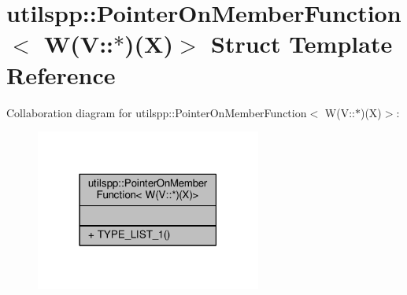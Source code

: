 \hypertarget{structutilspp_1_1PointerOnMemberFunction_3_01W_07V_1_1_5_08_07X_08_4}{\section{utilspp\-:\-:Pointer\-On\-Member\-Function$<$ W(V\-:\-:$\ast$)(X)$>$ Struct Template Reference}
\label{structutilspp_1_1PointerOnMemberFunction_3_01W_07V_1_1_5_08_07X_08_4}
}


Collaboration diagram for utilspp\-:\-:Pointer\-On\-Member\-Function$<$ W(V\-:\-:$\ast$)(X)$>$\-:\nopagebreak
\begin{figure}[H]
\begin{center}
\leavevmode
\includegraphics[width=210pt]{structutilspp_1_1PointerOnMemberFunction_3_01W_07V_1_1_5_08_07X_08_4__coll__graph}
\end{center}
\end{figure}
